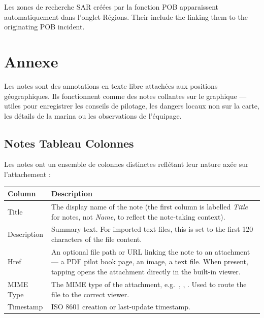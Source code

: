 \begin{notebox}
Les zones de recherche SAR créées par la fonction POB apparaissent automatiquement dans l'onglet Régions.
Their  include the  linking them to the originating POB incident.
\end{notebox}

\chapter{Annexe}
\label{ch:notes}

Les notes sont des annotations en texte libre attachées aux positions géographiques.
Ils fonctionnent comme des notes collantes sur le graphique --- utiles pour enregistrer les conseils de pilotage, les dangers locaux non
sur la carte, les détails de la marina ou les observations de l'équipage.


\section{Notes Tableau Colonnes}

Les notes ont un ensemble de colonnes distinctes reflétant leur nature axée sur l'attachement :

\begin{longtable}{L{2.4cm} L{11.3cm}}
\toprule
{}
{\sffamily\bfseries\color{white} Column} &
{\sffamily\bfseries\color{white} Description} \\
\midrule
Title & The display name of the note (the first column is labelled \textit{Title} for notes, not \textit{Name}, to reflect the note-taking context). \\
Description & Summary text. For imported text files, this is set to the first 120 characters of the file content. \\
Href & An optional file path or URL linking the note to an attachment --- a PDF pilot book page, an image, a text file. When present, tapping  opens the attachment directly in the built-in viewer. \\
MIME Type & The MIME type of the attachment, e.g.\ , , . Used to route the file to the correct viewer. \\
Timestamp & ISO 8601 creation or last-update timestamp. \\
\bottomrule
\end{longtable}


